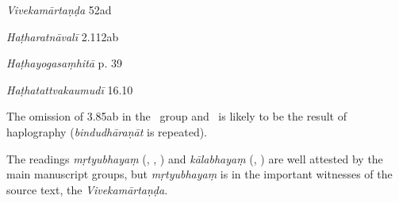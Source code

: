 \begin{ekdosis}
\begin{sources}[hp03_085]
\emph{Vivekamārtaṇḍa} 52ad
\begin{versinnote}
\end{versinnote}
\end{sources}

\begin{testimonia}[hp03_085]
\emph{Haṭharatnāvalī} 2.112ab
\begin{versinnote}
\end{versinnote}

\emph{Haṭhayogasaṃhitā} p. 39
\begin{versinnote}
\end{versinnote}

\emph{Haṭhatattvakaumudī} 16.10
\begin{versinnote}
\end{versinnote}
\end{testimonia}

\begin{philcomm}[hp03_085]
The omission of 3.85ab in the \texteta\ group and \deltaThree\ is likely to be the result of haplography (\emph{bindudhāraṇāt} is repeated).


The readings \emph{mṛtyubhayaṃ} (\alphaThree, \textbeta, \texteta) and \emph{kālabhayaṃ} (\alphaTwo, \textgamma) are well attested by the main manuscript groups, but \emph{mṛtyubhayaṃ} is in the important witnesses of the source text, the \emph{Vivekamārtaṇḍa}. %
\end{philcomm}


\end{ekdosis}
